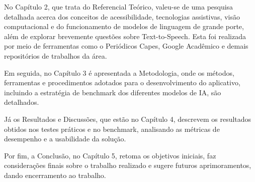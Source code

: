 No Capítulo 2, que trata do Referencial Teórico, valeu-se de uma pesquisa detalhada acerca dos conceitos de acessibilidade, tecnologias assistivas, visão computacional e do funcionamento de modelos de linguagem de grande porte, além de explorar brevemente questões sobre Text-to-Speech. Esta foi realizada por meio de ferramentas como o Periódicos Capes, Google Acadêmico e demais repositórios de trabalhos da área. 

Em seguida, no Capítulo 3 é apresentada a Metodologia, onde os métodos, ferramentas e procedimentos adotados para o desenvolvimento do aplicativo, incluindo a estratégia de benchmark dos diferentes modelos de IA, são detalhados. 

Já os Resultados e Discussões, que estão no Capítulo 4, descrevem os resultados obtidos nos testes práticos e no benchmark, analisando as métricas de desempenho e a usabilidade da solução. 

Por fim, a Conclusão, no Capítulo 5, retoma os objetivos iniciais, faz considerações finais sobre o trabalho realizado e sugere futuros aprimoramentos, dando encerramento ao trabalho.

